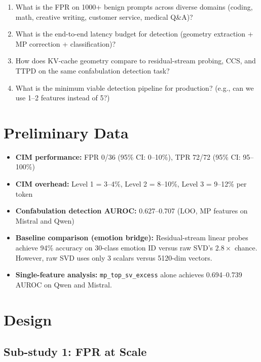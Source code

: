 \documentclass[11pt,letterpaper]{article}
\begin{document}
\begin{enumerate}[leftmargin=*]
  \item What is the FPR on 1000+ benign prompts across diverse domains
    (coding, math, creative writing, customer service, medical Q\&A)?

  \item What is the end-to-end latency budget for detection (geometry
    extraction + MP correction + classification)?

  \item How does KV-cache geometry compare to residual-stream probing,
    CCS, and TTPD on the same confabulation detection task?

  \item What is the minimum viable detection pipeline for production?
    (e.g., can we use 1--2 features instead of 5?)
\end{enumerate}

\section{Preliminary Data}

\begin{itemize}
  \item \textbf{CIM performance:} FPR 0/36 (95\% CI: 0--10\%), TPR 72/72
    (95\% CI: 95--100\%)
  \item \textbf{CIM overhead:} Level 1 = 3--4\%, Level 2 = 8--10\%, Level
    3 = 9--12\% per token
  \item \textbf{Confabulation detection AUROC:} 0.627--0.707 (LOO, MP
    features on Mistral and Qwen)
  \item \textbf{Baseline comparison (emotion bridge):} Residual-stream
    linear probes achieve 94\% accuracy on 30-class emotion ID versus raw
    SVD's $2.8\times$ chance. However, raw SVD uses only 3 scalars versus
    5120-dim vectors.
  \item \textbf{Single-feature analysis:} \texttt{mp\_top\_sv\_excess}
    alone achieves 0.694--0.739 AUROC on Qwen and Mistral.
\end{itemize}

\section{Design}

\subsection{Sub-study 1: FPR at Scale}
\end{document}
